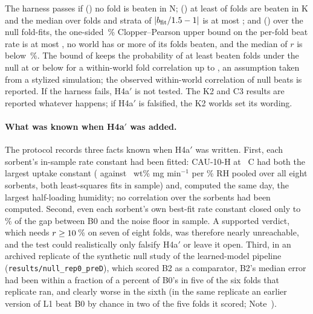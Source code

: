 \documentclass[11pt]{article}
\begin{document}
The harness passes if () no fold is beaten in N; () at least  of  folds are
beaten in K and the median over folds and strata of $|b_{\mathrm{fit}}/\V{si2_bK2}{1.5} - \C{1}|$ is at most ; and
() over the  null fold-fits, the one-sided \,\% Clopper--Pearson upper bound on the
per-fold beat rate is at most , no world has  or more of its folds beaten, and the
median of $r$ is below \,\%. The bound of  keeps the probability of at least
 beaten folds under the null at or below  for a within-world fold correlation up to
, an assumption taken from a stylized simulation; the observed within-world correlation of null
beats is reported. If the harness fails, H4a$'$ is
not tested. The K2 and C3 results are reported whatever happens; if H4a$'$ is falsified, the K2 worlds set its
wording.

\paragraph{What was known when H4a$'$ was added.} The protocol records three facts known when H4a$'$ was written. First, each sorbent's in-sample rate constant had been
fitted: CAU-10-H at ~\textdegree C had both the largest uptake constant ( against
~wt\% mg min$^{-1}$ per \% RH pooled over all eight sorbents, both least-squares fits in sample) and,
computed the same day, the largest half-loading humidity; no correlation over the sorbents had been computed. Second,
even each sorbent's own best-fit rate constant closed only  to \,\% of the gap between B0
and the noise floor in sample. A supported verdict, which needs $r \ge \V{dis_m}{10}$\,\% on seven of eight folds, was
therefore nearly unreachable, and the test could realistically only falsify H4a$'$ or leave it open. Third, in an
archived replicate of the synthetic null study of the learned-model pipeline (\texttt{results/null\_rep0\_preD}),
which scored B2 as a comparator, B2's median error had been within a fraction of a percent of B0's in five of the six
folds that replicate ran, and clearly worse in the sixth (in the same replicate an earlier version of L1 beat B0
by chance in two of the five folds it scored; Note~).
\end{document}
